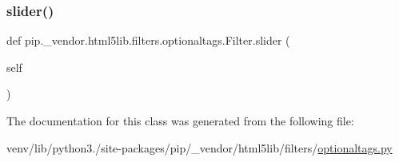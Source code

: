 \mbox{\label{classpip_1_1__vendor_1_1html5lib_1_1filters_1_1optionaltags_1_1Filter_af2f7a359cdf7f13851b20b2ea85d0018}} 
\subsubsection{\texorpdfstring{slider()}{slider()}}
{\footnotesize\ttfamily def pip.\+\_\+vendor.\+html5lib.\+filters.\+optionaltags.\+Filter.\+slider (\begin{DoxyParamCaption}\item[{}]{self }\end{DoxyParamCaption})}



The documentation for this class was generated from the following file\+:\begin{DoxyCompactItemize}
\item 
venv/lib/python3./site-\/packages/pip/\+\_\+vendor/html5lib/filters/\hyperlink{optionaltags_8py}{optionaltags.\+py}\end{DoxyCompactItemize}
